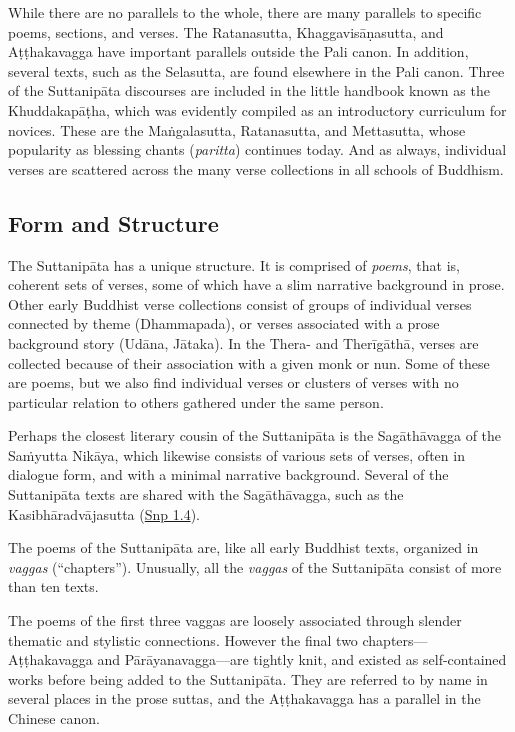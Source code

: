 \documentclass[12pt,openany]{book}%
\begin{document}
While there are no parallels to the whole, there are many parallels to specific poems, sections, and verses. The Ratanasutta, \textsanskrit{Khaggavisāṇasutta}, and \textsanskrit{Aṭṭhakavagga} have important parallels outside the Pali canon. In addition, several texts, such as the Selasutta, are found elsewhere in the Pali canon. Three of the \textsanskrit{Suttanipāta} discourses are included in the little handbook known as the \textsanskrit{Khuddakapāṭha}, which was evidently compiled as an introductory curriculum for novices. These are the \textsanskrit{Maṅgalasutta}, Ratanasutta, and Mettasutta, whose popularity as blessing chants (\textit{paritta}) continues today. And as always, individual verses are scattered across the many verse collections in all schools of Buddhism.

\subsection*{Form and Structure}

The \textsanskrit{Suttanipāta} has a unique structure. It is comprised of \emph{poems}, that is, coherent sets of verses, some of which have a slim narrative background in prose. Other early Buddhist verse collections consist of groups of individual verses connected by theme (Dhammapada), or verses associated with a prose background story (\textsanskrit{Udāna}, \textsanskrit{Jātaka}). In the Thera- and \textsanskrit{Therīgāthā}, verses are collected because of their association with a given monk or nun. Some of these are poems, but we also find individual verses or clusters of verses with no particular relation to others gathered under the same person.

Perhaps the closest literary cousin of the \textsanskrit{Suttanipāta} is the \textsanskrit{Sagāthāvagga} of the \textsanskrit{Saṁyutta} \textsanskrit{Nikāya}, which likewise consists of various sets of verses, often in dialogue form, and with a minimal narrative background. Several of the \textsanskrit{Suttanipāta} texts are shared with the \textsanskrit{Sagāthāvagga}, such as the \textsanskrit{Kasibhāradvājasutta} (\href{https://suttacentral.net/snp1.4/en/sujato}{Snp 1.4}).

The poems of the \textsanskrit{Suttanipāta} are, like all early Buddhist texts, organized in \textit{vaggas} (“chapters”). Unusually, all the \textit{vaggas} of the \textsanskrit{Suttanipāta} consist of more than ten texts.

The poems of the first three vaggas are loosely associated through slender thematic and stylistic connections. However the final two chapters—\textsanskrit{Aṭṭhakavagga} and \textsanskrit{Pārāyanavagga}—are tightly knit, and existed as self-contained works before being added to the \textsanskrit{Suttanipāta}. They are referred to by name in several places in the prose suttas, and the \textsanskrit{Aṭṭhakavagga} has a parallel in the Chinese canon.
\end{document}
